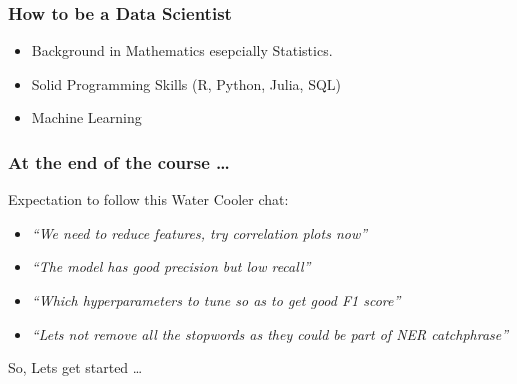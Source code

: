 \begin{frame}[fragile]\frametitle{How to be a Data Scientist}
\begin{itemize}
\item Background in Mathematics  esepcially Statistics.
\item Solid Programming Skills (R, Python, Julia, SQL)
\item Machine Learning
\end{itemize}
\end{frame}

\begin{frame}[fragile]\frametitle{At the end of the course \ldots}
Expectation to follow this Water Cooler chat:
\begin{itemize}
\item {\em ``We need to reduce features, try correlation plots now''}
\item {\em ``The model has good precision but low recall''}
\item {\em ``Which hyperparameters to tune so as to get good F1 score''}
\item {\em ``Lets not remove all the stopwords as they could be part of NER catchphrase''}
\end{itemize}
So, Lets get started \ldots
\end{frame}

